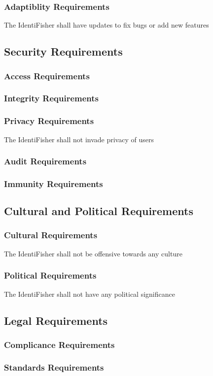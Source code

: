 \documentclass{article}
\begin{document}
\subsubsection{Adaptiblity Requirements}
The IdentiFisher shall have updates to fix bugs or add new features

\subsection{Security Requirements}
\subsubsection{Access Requirements}
\subsubsection{Integrity Requirements}
\subsubsection{Privacy Requirements}
The IdentiFisher shall not invade privacy of users
\subsubsection{Audit Requirements}
\subsubsection{Immunity Requirements}

\subsection{Cultural and Political Requirements}
\subsubsection{Cultural Requirements}
The IdentiFisher shall not be offensive towards any culture
\subsubsection{Political Requirements}
The IdentiFisher shall not have any political significance

\subsection{Legal Requirements}
\subsubsection{Complicance Requirements}
\subsubsection{Standards Requirements}
\end{document}
